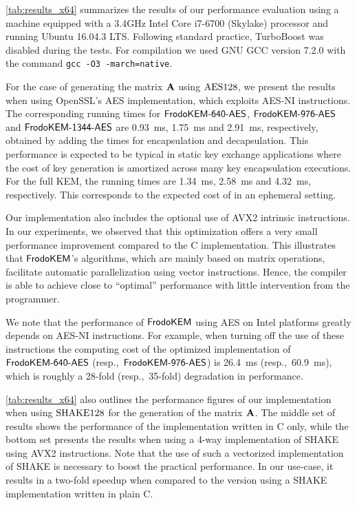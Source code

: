 \documentclass{iacrcc}
\begin{document}
\autoref{tab:results_x64} summarizes the results of our performance evaluation using a machine equipped
with a 3.4GHz Intel Core i7-6700 (Skylake) processor and running Ubuntu 16.04.3 LTS. Following standard practice,
TurboBoost was disabled during the tests. For compilation we used GNU GCC version 7.2.0 with the command
{\tt gcc -O3 -march=native}. 

For the case of generating the matrix $\mathbf{A}$ using $\textrm{\upshape\mdseries AES}128$, we present the results when using
OpenSSL's AES implementation, which exploits AES-NI instructions.
The corresponding running times for $\textsf{\upshape\mdseries FrodoKEM-640-AES}$, $\textsf{\upshape\mdseries FrodoKEM-976-AES}$ and $\textsf{\upshape\mdseries FrodoKEM-1344-AES}$ are
0.93~ms, 1.75~ms and 2.91~ms, respectively, obtained by adding the times for encapsulation and decapsulation.
This performance is expected to be typical in static key exchange applications where the cost of key generation
is amortized across many key encapsulation executions. 
For the full KEM, the running times are 1.34~ms, 2.58~ms and 4.32~ms, respectively. This corresponds to the
expected cost of \eFrodoKEM in an ephemeral setting.

Our implementation also includes the optional use of AVX2 intrinsic instructions. In our experiments, we observed that
this optimization offers a very small performance improvement compared to the C implementation. 
This illustrates that $\textsf{\upshape\mdseries FrodoKEM}$'s algorithms, which are mainly based on matrix operations, facilitate
automatic parallelization using vector instructions. Hence, the compiler is able to achieve close to ``optimal''
performance with little intervention from the programmer.

We note that the performance of $\textsf{\upshape\mdseries FrodoKEM}$ using AES on Intel platforms greatly depends on AES-NI instructions.
For example, when turning off the use of these instructions the computing cost of the optimized implementation
of $\textsf{\upshape\mdseries FrodoKEM-640-AES}$ (resp.,~$\textsf{\upshape\mdseries FrodoKEM-976-AES}$) is 26.4~ms (resp.,~60.9~ms), which is roughly a 28-fold
(resp.,~35-fold) degradation in performance.

\autoref{tab:results_x64} also outlines the performance figures of our implementation when using $\textrm{\upshape\mdseries SHAKE}128$
for the generation of the matrix $\mathbf{A}$. 
The middle set of results shows the performance of the implementation written in C only, while the bottom
set presents the results when using a 4-way implementation of SHAKE using AVX2 instructions.
Note that the use of such a vectorized implementation of SHAKE is necessary to boost the practical performance.
In our use-case, it results in a two-fold speedup when compared to the version using a SHAKE implementation
written in plain C.
\end{document}
